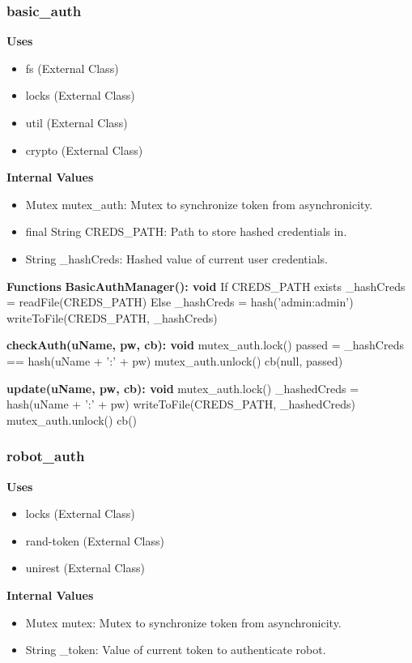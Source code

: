 \documentclass [10pt]{article}
\begin{document}

\subsubsection{basic\_auth}
\textbf{Uses}
\begin{itemize}
	\item fs (External Class)
	\item locks (External Class)
	\item util (External Class)
	\item crypto (External Class)
\end{itemize}

\textbf{Internal Values}
\begin{itemize}
	\item Mutex mutex\_auth: Mutex to synchronize token from asynchronicity.
	\item final String CREDS\_PATH: Path to store hashed credentials in.
	\item String \_hashCreds: Hashed value of current user credentials.
\end{itemize}

\textbf{Functions}
\textbf{BasicAuthManager(): void}
If CREDS\_PATH exists
	\_hashCreds = readFile(CREDS\_PATH)
Else
	\_hashCreds = hash('admin:admin')
	writeToFile(CREDS\_PATH, \_hashCreds)

\textbf{checkAuth(uName, pw, cb): void}
mutex\_auth.lock()
passed = \_hashCreds == hash(uName + ':' + pw)
mutex\_auth.unlock()
cb(null, passed)

\textbf{update(uName, pw, cb): void}
mutex\_auth.lock()
\_hashedCreds =  hash(uName + ':' + pw)
writeToFile(CREDS\_PATH, \_hashedCreds)
mutex\_auth.unlock()
cb()


\subsubsection{robot\_auth}
\textbf{Uses}
\begin{itemize}
	\item locks (External Class)
	\item rand-token (External Class)
	\item unirest (External Class)
\end{itemize}

\textbf{Internal Values}
\begin{itemize}
	\item Mutex mutex: Mutex to synchronize token from asynchronicity.
	\item String \_token: Value of current token to authenticate robot.
\end{itemize}
\end{document}
